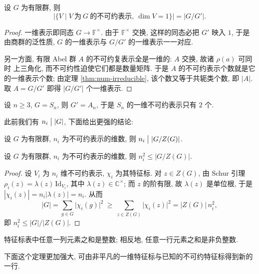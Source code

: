 \begin{theorem}\label{thm:one-dim-count}
设 $G$ 为有限群, 则
\[
  \bigl|\{V\mid V\ \text{为}\ G\ \text{的不可约表示},\ \dim V=1\}\bigr|=|G/G'|.
\]
\end{theorem}

\begin{proof}
一维表示即同态 $G\to\mathbb{F}^{\times}$. 由于 $\mathbb{F}^{\times}$ 交换, 这样的同态必把
$G'$ 映入 $1$, 于是由商群的泛性质, $G$ 的一维表示与 $G/G'$ 的一维表示一一对应.

另一方面, 有限 Abel 群 $A$ 的不可约复表示全是一维的: $A$ 交换, 故诸 $\rho(a)$ 可同时
上三角化, 而不可约性迫使它们都是数量矩阵. 于是 $A$ 的不可约表示个数就是它的一维表示个数;
由定理 \ref{thm:num-irreducible}, 该个数又等于共轭类个数, 即 $|A|$. 取 $A=G/G'$ 即得
$|G/G'|$ 个一维表示.
\end{proof}

\begin{corollary}\label{cor:Sn-one-dim}
设 $n\ge3$, $G=S_n$, 则 $G'=A_n$, 于是 $S_n$ 的一维不可约表示只有 $2$ 个.
\end{corollary}

此前我们有 $n_i\mathrel{\big|}|G|$, 下面给出更强的结论:

\begin{theorem}\label{thm:degree-divides-center-quotient}
设 $G$ 为有限群, $n_i$ 为不可约表示的维数, 则 $n_i\mathrel{\big|} |G/Z(G)|$.
\end{theorem}

\begin{theorem}\label{thm:degree-square-center-quotient}
设 $G$ 为有限群, $n_i$ 为不可约表示的维数, 则 $n_i^2\le |G/Z(G)|$.
\end{theorem}

\begin{proof}
设 $V_i$ 为 $n_i$ 维不可约表示, $\chi_i$ 为其特征标. 对 $z\in Z(G)$, 由 Schur 引理
$\rho_i(z)=\lambda(z)\,\mathrm{Id}_{V_i}$, 其中 $\lambda(z)\in\mathbb{C}^{\times}$;
而 $z$ 的阶有限, 故 $\lambda(z)$ 是单位根, 于是 $|\chi_i(z)|=n_i|\lambda(z)|=n_i$. 从而
\[
  |G|=\sum_{g\in G}\bigl|\chi_i(g)\bigr|^2
  \ \ge\ \sum_{z\in Z(G)}\bigl|\chi_i(z)\bigr|^2
  =|Z(G)|\,n_i^2,
\]
即 $n_i^2\le |G|/|Z(G)|$.
\end{proof}

\begin{theorem}\label{thm:row-column-sums}
特征标表中任意一列元素之和是整数; 相反地, 任意一行元素之和是非负整数.
\end{theorem}

下面这个定理更加强大, 可由非平凡的一维特征标与已知的不可约特征标得到新的一行.

